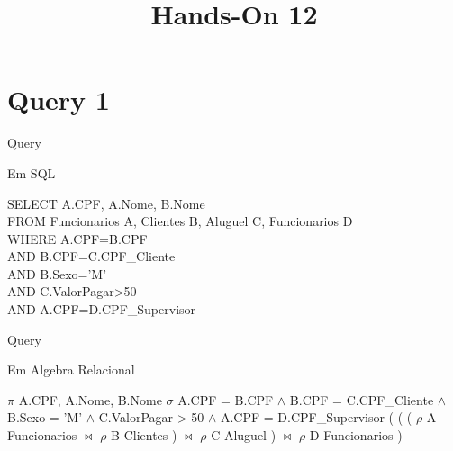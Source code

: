 \documentclass[aspectratio=169]{beamer}
\title{Hands-On 12}
\begin{document}
    \begin{frame}

    \titlepage

    \end{frame}



    \section{Query 1}

    \begin{frame}{Query}
     
      Em SQL

      \begin{flushleft}
          SELECT A.CPF, A.Nome, B.Nome \\
          FROM Funcionarios A, Clientes B, Aluguel C, Funcionarios D \\
          WHERE A.CPF=B.CPF \\
          AND B.CPF=C.CPF\_Cliente \\
          AND B.Sexo='M' \\
          AND C.ValorPagar>50 \\
          AND A.CPF=D.CPF\_Supervisor \\
      \end{flushleft}

    \end{frame}

    \begin{frame}{Query}
  
      Em Algebra Relacional
      \begin{flushleft}
        $\pi$ A.CPF, A.Nome, B.Nome $\sigma$ A.CPF = B.CPF $\wedge$ B.CPF = C.CPF\_Cliente $\wedge$ B.Sexo = 'M' $\wedge$ C.ValorPagar > 50 $\wedge$ A.CPF = D.CPF\_Supervisor ( ( ( $\rho$ A Funcionarios $\bowtie$ $\rho$ B Clientes ) $\bowtie$ $\rho$ C Aluguel ) $\bowtie$ $\rho$ D Funcionarios ) 
      \end{flushleft}
    \end{frame}
    
\end{document}
